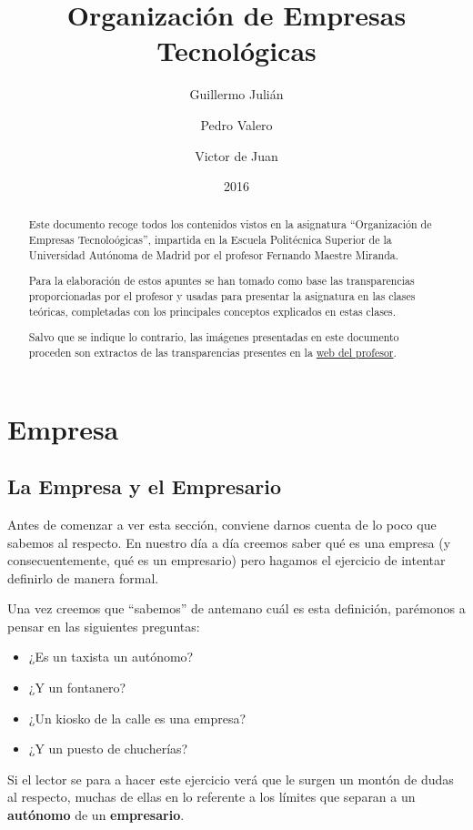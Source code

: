 \documentclass[nochap,palatino,shortheader]{apuntes}
\title{Organización de Empresas Tecnológicas}
\author{Guillermo Julián\and Pedro Valero \and Victor de Juan}
\date{2016}
\begin{document}
\pagestyle{plain}

\begin{abstract}
Este documento recoge todos los contenidos vistos en la asignatura ``Organización de Empresas Tecnoloógicas'', impartida en la Escuela Politécnica Superior de la Universidad Autónoma de Madrid por el profesor Fernando Maestre Miranda.

Para la elaboración de estos apuntes se han tomado como base las transparencias proporcionadas por el profesor y usadas para presentar la asignatura en las clases teóricas, completadas con los principales conceptos explicados en estas clases.

Salvo que se indique lo contrario, las imágenes presentadas en este documento proceden son extractos de las transparencias presentes en la \href{http://maestremiranda.com}{web del profesor}.
\end{abstract}

\maketitle

\tableofcontents
\newpage
\section{Empresa}

\subsection{La Empresa y el Empresario}

Antes de comenzar a ver esta sección, conviene darnos cuenta de lo poco que sabemos al respecto. En nuestro día a día creemos saber qué es una empresa (y consecuentemente, qué es un empresario) pero hagamos el ejercicio de intentar definirlo de manera formal.

Una vez creemos que ``sabemos'' de antemano cuál es esta definición, parémonos a pensar en las siguientes preguntas:

\begin{itemize}
\item ¿Es un taxista un autónomo?
\item ¿Y un fontanero?
\item ¿Un kiosko de la calle es una empresa?
\item ¿Y un puesto de chucherías?
\end{itemize}

Si el lector se para a hacer este ejercicio verá que le surgen un montón de dudas al respecto, muchas de ellas en lo referente a los límites que separan a un \textbf{autónomo} de un \textbf{empresario}.
\end{document}
